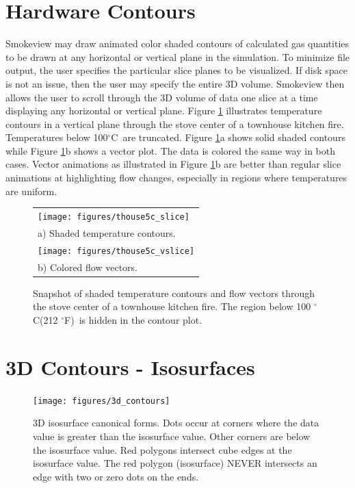 \documentclass[11pt,twoside]{book}
\newcommand{\degF}{$^\circ$F}
\newcommand{\degC}{$^\circ$C}
\newcommand{\figoptions}{P}
\begin{document}
\section{Hardware Contours}
Smokeview may draw animated color shaded contours of calculated gas
quantities to be drawn at any horizontal or vertical plane in the
simulation. To minimize file output, the user specifies the
particular slice planes to be visualized.  If disk space is not an
issue, then the user may specify the entire 3D volume. Smokeview
then allows the user to scroll through the 3D volume of data one
slice at a time displaying any horizontal or vertical plane.
Figure \ref{figslice} illustrates temperature contours in a
vertical plane through the stove center of a townhouse kitchen fire.
Temperatures below 100\degC\ are truncated. Figure \ref{figslice}a
shows solid shaded contours while Figure \ref{figslice}b shows a
vector plot. The data is colored the same way in both cases.
Vector animations as illustrated in Figure \ref{figslice}b are
better than regular slice animations at highlighting flow changes,
especially in regions where temperatures are uniform.
\begin{figure}[\figoptions]
\begin{center}
\begin{tabular}{l}
 \texttt{[image: figures/thouse5c\_slice]}\\
a) Shaded temperature contours.\\
 \texttt{[image: figures/thouse5c\_vslice]}\\
b) Colored flow vectors.\\
\end{tabular}
\end{center}
\caption{Snapshot of shaded temperature contours and flow vectors
through the stove center of a townhouse kitchen fire.
The region below 100 \degC (212 \degF)\ is hidden
in the contour plot.
  }
\label{figslice}%
\end{figure}

\section{3D Contours - Isosurfaces}


\begin{figure}[\figoptions]
\begin{center}
\texttt{[image: figures/3d\_contours]}
\end{center}
\caption[3D isosurface canonical forms.]{3D isosurface canonical forms.
Dots occur at corners where the data value is greater than the isosurface value.  Other corners are below the isosurface value.  Red polygons intersect cube edges at the isosurface value.  The red polygon (isosurface) NEVER intersects an edge with two or zero dots on the ends.
  }
\label{figisosetup}%
\end{figure}
\end{document}
